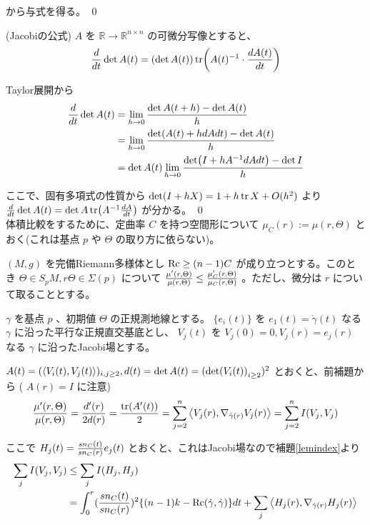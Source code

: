 \documentclass[dvipdfmx,a4paper]{jsreport}
\theoremstyle{definition}
\newcommand{\Rc}{{\rm Rc}}
\newcommand{\R}{\mathbb{R}}
\begin{document}
から与式を得る。 \qed

\lem (Jacobiの公式) $A$ を $\R \to \R^{n\times n}$ の可微分写像とすると、 
\begin{align*}
    {d \over dt}\det A(t)=(\det A(t))\tr(A(t)^{-1}\cdot {dA(t) \over dt})
\end{align*}

\prf Taylor展開から
\begin{align*}
    {d \over dt}\det A(t) &= \lim_{h \to 0}{{\det A(t+h)-\det A(t)} \over h} \\
    &= \lim_{h \to 0}{{\det (A(t)+h{dA}{dt})-\det A(t)} \over h} \\
    &= \det A(t)\lim_{h \to 0}{{\det (I+hA^{-1}{dA}{dt})-\det I} \over h}
\end{align*}

ここで、固有多項式の性質から $\det(I+hX)=1+h\tr X+O(h^2)$ より ${d \over dt}\det A(t)=\det A\tr(A^{-1}{dA\over dt})$ が分かる。 \qed
\\

体積比較をするために、定曲率 $C$ を持つ空間形について $\mu_C(r):=\mu(r,\Theta)$ とおく(これは基点 $p$ や $\Theta$ の取り方に依らない)。

\lem $(M,g)$ を完備Riemann多様体とし $\Rc \geq (n-1)C$ が成り立つとする。このとき $\Theta \in S_pM,r\Theta \in \Sigma(p)$ について ${\mu'(r,\Theta) \over \mu(r,\Theta)} \leq {\mu_C'(r,\Theta) \over \mu_C(r,\Theta)}$ 。ただし、微分は $r$ について取ることとする。

\prf $\gamma$ を基点 $p$ 、初期値 $\Theta$ の正規測地線とする。 $\{e_i(t)\}$ を $e_1(t)=\dot{\gamma}(t)$ なる $\gamma$ に沿った平行な正規直交基底とし、 $V_j(t)$ を $V_j(0)=0,V_j(r)=e_j(r)$ なる $\gamma$ に沿ったJacobi場とする。

$A(t)=(\ev{V_i(t),V_j(t)})_{i,j\geq 2},d(t)=\det A(t)=(\det(V_i(t))_{i \geq 2})^2$ とおくと、前補題から ( $A(r)=I$ に注意)
\begin{align*}
    {\mu'(r,\Theta) \over \mu(r,\Theta)}={d'(r) \over 2d(r)}={\tr(A'(t)) \over 2}=\sum_{j=2}^n \ev{V_j(r),\nabla_{\dot{\gamma}(r)}V_j(r)}=\sum_{j=2}^n I(V_j,V_j)
\end{align*}

ここで $H_j(t)={sn_C(t) \over sn_C(r)}e_j(t)$ とおくと、これはJacobi場なので補題\ref{lemindex}より
\begin{align*}
    \sum_j I(V_j,V_j) &\leq \sum_j I(H_j,H_j) \\
    &= \int_{0}^r ({sn_C(t) \over sn_C(r)})^2\{(n-1)k-\Rc(\dot{\gamma},\dot{\gamma})\}dt+\sum_j \ev{H_j(r),\nabla_{\dot{\gamma}(r)}H_j(r)}
\end{align*}
\end{document}
